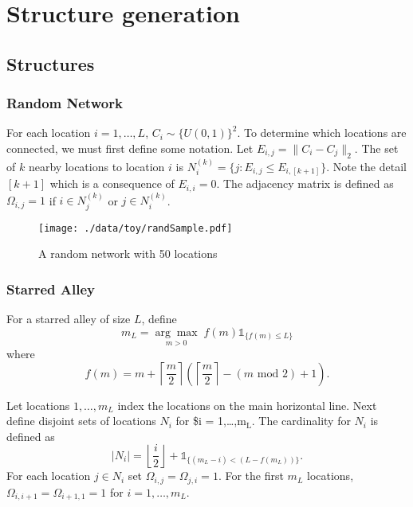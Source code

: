 \documentclass[11pt]{article}
\begin{document}
\section{Structure generation}
\label{sec-3}

\subsection{Structures}
\label{sec-3-1}

\subsubsection{Random Network}
\label{sec-3-1-1}

For each location $i=1,\ldots,L$, $C_i \sim \lbrace U(0,1)\rbrace^2$.
To determine which locations are connected, we must first define some
notation.  Let $E_{i,j} = \|C_{i} - C_{j}\|_2$.  The set of $k$ nearby
locations to location $i$ is $N^{(k)}_i = \lbrace j : E_{i,j} \le
E_{i,[k+1]} \rbrace$.  Note the detail $[k+1]$ which is a consequence
of $E_{i,i} = 0$.  The adjacency matrix is defined as $\Omega_{i,j} =
1$ if $i \in N_{j}^{(k)}$ or $j \in N_{i}^{(k)}$.


\begin{figure}[htb]
\centering
\texttt{[image: ./data/toy/randSample.pdf]}
\caption{\label{fig:rand50}A random network with 50 locations}
\end{figure}



\subsubsection{Starred Alley}
\label{sec-3-1-2}

For a starred alley of size $L$, define
\begin{equation*}
  m_L= \underset{m > 0}{\arg\max} \; f(m) \mathds{1}_{\lbrace f(m) \le L
    \rbrace }
\end{equation*}
where
\begin{equation*}
  f(m) = m + \left\lceil \frac{m}{2}
  \right\rceil 
  \left(\left\lceil \frac{m}{2} \right\rceil
    - (m \text{ mod } 2) + 1 \right).
\end{equation*}

Let locations $1,\ldots,m_L$ index the locations on the main
horizontal line.  Next define disjoint sets of locations
$N_i$ for \$i = 1,\ldots,m$_{\text{L}}$.  The cardinality for
$N_i$ is defined as
\begin{equation*}
  | N_i | = \left\lfloor \frac{i}{2} \right\rfloor +
  \mathds{1}_{\lbrace(m_L - i) < (L - f(m_L))\rbrace}.
\end{equation*}
For each location $j \in N_i$ set $\Omega_{i,j} = \Omega_{j,i} = 1$.
For the first $m_L$ locations, $\Omega_{i,i+1} = \Omega_{i+1,1} = 1$ for
$i = 1,\ldots,m_L$.
\end{document}
